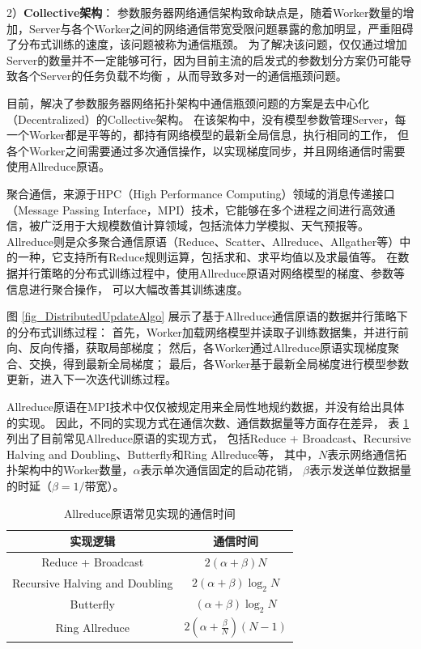 \documentclass{xdupgthesis}
\begin{document}
2）\textbf{Collective架构}：
参数服务器网络通信架构致命缺点是，随着Worker数量的增加，Server与各个Worker之间的网络通信带宽受限问题暴露的愈加明显，严重阻碍了分布式训练的速度，该问题被称为通信瓶颈。
为了解决该问题，仅仅通过增加Server的数量并不一定能够可行，因为目前主流的启发式的参数划分方案仍可能导致各个Server的任务负载不均衡 \cite{chen2020elastic}，从而导致多对一的通信瓶颈问题。

目前，解决了参数服务器网络拓扑架构中通信瓶颈问题的方案是去中心化（Decentralized）的Collective架构。
在该架构中，没有模型参数管理Server，每一个Worker都是平等的，都持有网络模型的最新全局信息，执行相同的工作，
但各个Worker之间需要通过多次通信操作，以实现梯度同步，并且网络通信时需要使用Allreduce原语。

聚合通信，来源于HPC（High Performance Computing）领域的消息传递接口（Message Passing Interface，MPI）技术，它能够在多个进程之间进行高效通信，被广泛用于大规模数值计算领域，包括流体力学模拟、天气预报等。
Allreduce则是众多聚合通信原语（Reduce、Scatter、Allreduce、Allgather等）中的一种，它支持所有Reduce规则运算，包括求和、求平均值以及求最值等。
在数据并行策略的分布式训练过程中，使用Allreduce原语对网络模型的梯度、参数等信息进行聚合操作， 可以大幅改善其训练速度。

图 \ref{fig_DistributedUpdateAlgo}  
展示了基于Allreduce通信原语的数据并行策略下的分布式训练过程：
首先，Worker加载网络模型并读取子训练数据集，并进行前向、反向传播，获取局部梯度；
然后，各Worker通过Allreduce原语实现梯度聚合、交换，得到最新全局梯度；
最后，各Worker基于最新全局梯度进行模型参数更新，进入下一次迭代训练过程。

Allreduce原语在MPI技术中仅仅被规定用来全局性地规约数据，并没有给出具体的实现。
因此，不同的实现方式在通信次数、通信数据量等方面存在差异，
表 \ref{tab_Allreduce} 列出了目前常见Allreduce原语的实现方式，
包括Reduce + Broadcast、Recursive Halving and Doubling、Butterfly和Ring Allreduce等，
其中，$N$表示网络通信拓扑架构中的Worker数量，$\alpha$表示单次通信固定的启动花销，
$\beta$表示发送单位数据量的时延（$\beta = 1/\mbox{带宽}$）。
\renewcommand{\arraystretch}{1.3}
\begin{table}[ht]
    \centering
    \caption{Allreduce原语常见实现的通信时间 \cite{b_分布式2018}}
    \label{tab_Allreduce}
    \begin{tabular}{cc}
        \toprule
        \toprule
            实现逻辑 & 通信时间 \\
        \midrule
            Reduce + Broadcast & $2(\alpha + \beta) N$ \\
            Recursive Halving and Doubling & $2(\alpha + \beta) \log_{2}{N}$ \\
            Butterfly & $(\alpha + \beta) \log_{2}{N}$ \\
            Ring Allreduce & $2(\alpha + \frac{\beta}{N})(N-1)$ \\
        \bottomrule
        \bottomrule
    \end{tabular}
\end{table}
\end{document}
